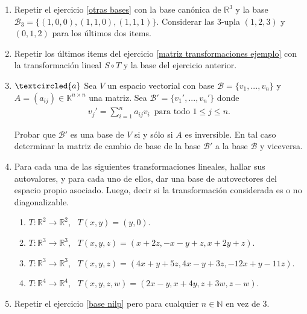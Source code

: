 \begin{enumerate}[resume, topsep=5pt,itemsep=5pt]

    \item\label{otras bases 3} Repetir el ejercicio \ref{otras bases} con la base canónica de $\mathbb{R}^3$ y la base $\mathcal{B}_3=\{(1,0,0),(1,1,0),(1,1,1)\}$. Considerar las $3$-upla $(1,2,3)$ y $(0,1,2)$ para los últimos dos items.


\item Repetir los últimos items del ejercicio \ref{matriz transformaciones ejemplo} con la transformación lineal $S\circ T$ y la base del ejercicio anterior.

\item\label{cambio de base} $\textcircled{a}$ Sea $V$ un espacio vectorial con base $\mathcal{B}=\{v_1, ..., v_n\}$ y $A=(a_{ij})\in\mathbb{K}^{n\times n}$ una matriz. Sea $\mathcal{B}'=\{v_1', ..., v_n'\}$ donde
\begin{align*}
v_j'=\sum_{i=1}^na_{ij}v_i\,\mbox{ para todo $1\leq j\leq n$}. 
\end{align*}

Probar que $\mathcal{B}'$ es una base de $V$ si y sólo si $A$ es inversible. En tal caso determinar la matriz de cambio de base de la base $\mathcal{B}'$ a la base $\mathcal{B}$ y viceversa.

\item Para cada una de las siguientes transformaciones lineales, hallar sus autovalores,
    y para cada uno de ellos, dar una base de autovectores del espacio propio asociado. Luego, decir si la
    transformación considerada es o no  diagonalizable.
    \begin{enumerate}
        \item $T:\mathbb{R}^2\to \mathbb{R}^2$, \ $T(x,y)=(y,0)$.
        \item $T:\mathbb{R}^3\to \mathbb{R}^3$, \ $T(x,y,z)=(x+2z,-x-y+z,x+2y+z)$.
        \item $T:\mathbb{R}^3\to \mathbb{R}^3$, \ $T(x,y,z)=(4x+y+5z,4x-y+3z,-12x+y-11z)$.
        \item $T:\mathbb{R}^4\to \mathbb{R}^4$, \ $T(x,y,z,w)=(2x-y,x+4y,z+3w,z-w)$.
    \end{enumerate}

\item Repetir el ejercicio \ref{base nilp}  pero para cualquier $n\in\mathbb{N}$ en vez de $3$.

\end{enumerate}

